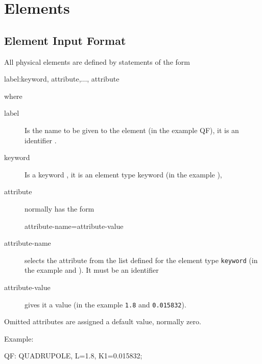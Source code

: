 
\chapter{Elements}
\label{chp:element}

\section{Element Input Format}
\label{sec:elm-format}
All physical elements are defined by statements of the form
\begin{example}
label:keyword, attribute,..., attribute
\end{example}
where
\begin{description}

\item[label]
   \Newline
  Is the name to be given to the element (in the example QF),
  it is an {identifier} .

\item[keyword] \Newline
  Is a {keyword} ,
  it is an element type keyword (in the example ),
\item[attribute]  \Newline
  normally has the form
\begin{example}
attribute-name=attribute-value
\end{example}
\item[attribute-name]  \Newline
  selects the attribute from the list defined for the element type
  \texttt{keyword} (in the example  and ).
  It must be an {identifier} 
\item[attribute-value] \Newline
  gives it a {value} 
  (in the example \texttt{1.8} and \texttt{0.015832}).
\end{description}
Omitted attributes are assigned a default value, normally zero.

\noindent Example:
\begin{example}
QF: QUADRUPOLE, L=1.8, K1=0.015832;
\end{example}



